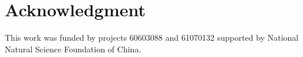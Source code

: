 \documentclass[journal]{IEEEtran}
\begin{document}

%





\section*{Acknowledgment}

This work was funded by projects 60603088 and 61070132 supported by National Natural Science Foundation of China.



\end{document}
